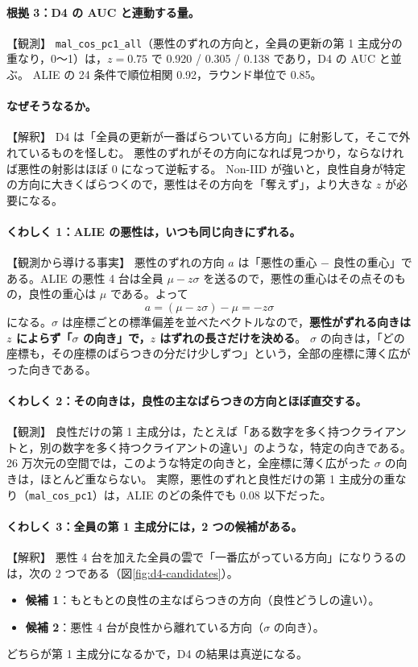 \documentclass[a4j, dvipdfmx]{jsarticle}  %
\begin{document}
\paragraph{根拠 3：D4 の AUC と連動する量。}【観測】
\texttt{mal\_cos\_pc1\_all}（悪性のずれの方向と，全員の更新の第 1 主成分の重なり，0〜1）は，$z = 0.75$ で 0.920 / 0.305 / 0.138 であり，D4 の AUC と並ぶ。
ALIE の 24 条件で順位相関 0.92，ラウンド単位で 0.85。

\paragraph{なぜそうなるか。}【解釈】
D4 は「全員の更新が一番ばらついている方向」に射影して，そこで外れているものを怪しむ。
悪性のずれがその方向になれば見つかり，ならなければ悪性の射影はほぼ 0 になって逆転する。
Non-IID が強いと，良性自身が特定の方向に大きくばらつくので，悪性はその方向を「奪えず」，より大きな $z$ が必要になる。

\paragraph{くわしく 1：ALIE の悪性は，いつも同じ向きにずれる。}【観測から導ける事実】
悪性のずれの方向 $a$ は「悪性の重心 $-$ 良性の重心」である。ALIE の悪性 4 台は全員 $\mu - z\sigma$ を送るので，悪性の重心はその点そのもの，良性の重心は $\mu$ である。よって
\begin{equation*}
  a = (\mu - z\sigma) - \mu = -z\sigma
\end{equation*}
になる。$\sigma$ は座標ごとの標準偏差を並べたベクトルなので，\textbf{悪性がずれる向きは $z$ によらず「$\sigma$ の向き」で，$z$ はずれの長さだけを決める}。
$\sigma$ の向きは，「どの座標も，その座標のばらつきの分だけ少しずつ」という，全部の座標に薄く広がった向きである。

\paragraph{くわしく 2：その向きは，良性の主なばらつきの方向とほぼ直交する。}【観測】
良性だけの第 1 主成分は，たとえば「ある数字を多く持つクライアントと，別の数字を多く持つクライアントの違い」のような，特定の向きである。
26 万次元の空間では，このような特定の向きと，全座標に薄く広がった $\sigma$ の向きは，ほとんど重ならない。
実際，悪性のずれと良性だけの第 1 主成分の重なり（\texttt{mal\_cos\_pc1}）は，ALIE のどの条件でも 0.08 以下だった。

\paragraph{くわしく 3：全員の第 1 主成分には，2 つの候補がある。}【解釈】
悪性 4 台を加えた全員の雲で「一番広がっている方向」になりうるのは，次の 2 つである（図\ref{fig:d4-candidates}）。
\begin{itemize}
  \item \textbf{候補 1}：もともとの良性の主なばらつきの方向（良性どうしの違い）。
  \item \textbf{候補 2}：悪性 4 台が良性から離れている方向（$\sigma$ の向き）。
\end{itemize}
どちらが第 1 主成分になるかで，D4 の結果は真逆になる。
\end{document}
